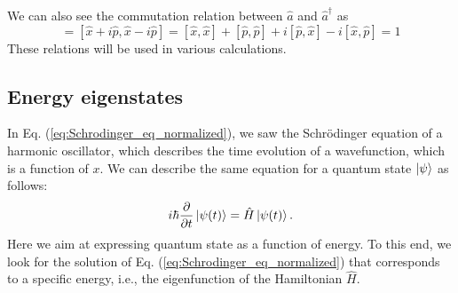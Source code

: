 We can also see the commutation relation between $\hat a$ and $\hat a^\dagger$ as
\begin{equation}
  [\hat a, \hat a^\dagger] = [\hat x + i\hat p, \hat x - i\hat p] = [\hat x,\hat x] + [\hat p, \hat p] + i[\hat p, \hat x] - i[\hat x, \hat p] = 1
\end{equation}
These relations will be used in various calculations.

\subsection{Energy eigenstates}

In Eq. (\ref{eq:Schrodinger_eq_normalized}), we saw the Schr\"odinger equation of a harmonic oscillator, which describes the time evolution of a wavefunction, which is a function of $x$. We can describe the same equation for a quantum state $\ket \psi$ as follows:
\begin{equation}
i\hbar\frac{\partial}{\partial t}\ket {\psi(t)} = \hat H \ket {\psi(t)}.
\label{eq:Schrodinger_eq_for_quantum_state}
\end{equation}
Here we aim at expressing quantum state as a function of energy. To this end, we look for the solution of Eq. (\ref{eq:Schrodinger_eq_normalized}) that corresponds to a specific energy, i.e., the eigenfunction of the Hamiltonian $\hat H$.

